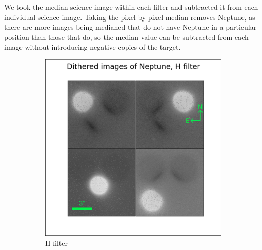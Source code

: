 \documentclass{article}
\begin{document}
    We took the median science image within each filter and subtracted it from each individual science image. Taking the pixel-by-pixel median removes Neptune, as there are more images being medianed that do not have Neptune in a particular position than those that do, so the median value can be subtracted from each image without introducing negative copies of the target. 

    \begin{figure}
        \centering
        \begin{subfigure}[b]{0.3\textwidth}
            \centering
            \includegraphics[width=\textwidth]{uncorr_H_sc.png}
            \caption[uncorr H]%
            {{\small H filter}}    
            \label{fig:uncorr_H}
        \end{subfigure}
        \hfill
        \begin{subfigure}[b]{0.3\textwidth}
            \centering

\end{subfigure}
\end{figure}
\end{document}
